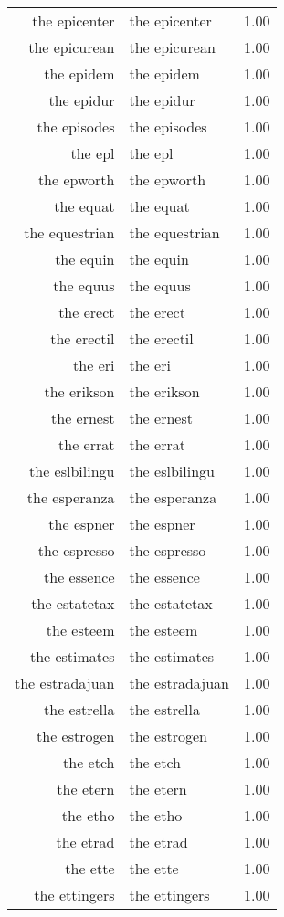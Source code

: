\begin{table}[ht]
\begin{tabular}{rlr}
  the epicenter & the epicenter & 1.00 \\ 
  the epicurean & the epicurean & 1.00 \\ 
  the epidem & the epidem & 1.00 \\ 
  the epidur & the epidur & 1.00 \\ 
  the episodes & the episodes & 1.00 \\ 
  the epl & the epl & 1.00 \\ 
  the epworth & the epworth & 1.00 \\ 
  the equat & the equat & 1.00 \\ 
  the equestrian & the equestrian & 1.00 \\ 
  the equin & the equin & 1.00 \\ 
  the equus & the equus & 1.00 \\ 
  the erect & the erect & 1.00 \\ 
  the erectil & the erectil & 1.00 \\ 
  the eri & the eri & 1.00 \\ 
  the erikson & the erikson & 1.00 \\ 
  the ernest & the ernest & 1.00 \\ 
  the errat & the errat & 1.00 \\ 
  the eslbilingu & the eslbilingu & 1.00 \\ 
  the esperanza & the esperanza & 1.00 \\ 
  the espner & the espner & 1.00 \\ 
  the espresso & the espresso & 1.00 \\ 
  the essence & the essence & 1.00 \\ 
  the estatetax & the estatetax & 1.00 \\ 
  the esteem & the esteem & 1.00 \\ 
  the estimates & the estimates & 1.00 \\ 
  the estradajuan & the estradajuan & 1.00 \\ 
  the estrella & the estrella & 1.00 \\ 
  the estrogen & the estrogen & 1.00 \\ 
  the etch & the etch & 1.00 \\ 
  the etern & the etern & 1.00 \\ 
  the etho & the etho & 1.00 \\ 
  the etrad & the etrad & 1.00 \\ 
  the ette & the ette & 1.00 \\ 
  the ettingers & the ettingers & 1.00 \\ 

\end{tabular}
\end{table}
